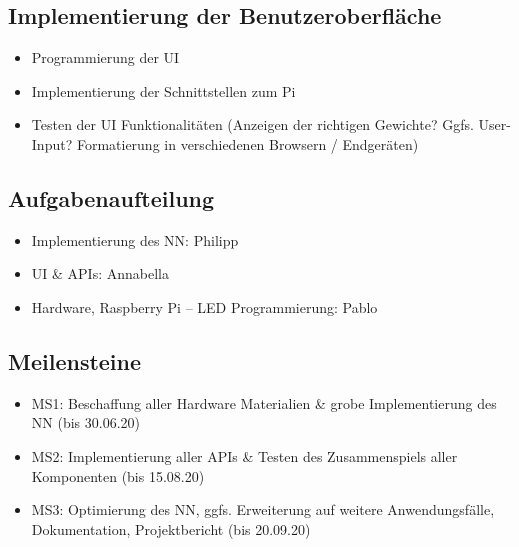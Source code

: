 \subsection{Implementierung der Benutzeroberfläche}
\label{sec:ImplementierungBenutzeroberflaeche}

\begin{itemize}
	\item Programmierung der UI
	\item Implementierung der Schnittstellen zum Pi 
	\item Testen der UI Funktionalit\"aten (Anzeigen der richtigen Gewichte? Ggfs. User-Input? Formatierung in verschiedenen Browsern / Endger\"aten)
\end{itemize}



\subsection{Aufgabenaufteilung}
\label{sec:aufgabenaufteilung}

\begin{itemize}
	\item Implementierung des NN: Philipp
	\item UI \& APIs: Annabella
	\item Hardware, Raspberry Pi -- LED Programmierung: Pablo
\end{itemize}


\subsection{Meilensteine}
\label{sec:meilensteine}

\begin{itemize}
	\item MS1: Beschaffung aller Hardware Materialien \& grobe Implementierung des NN (bis 30.06.20)
	\item MS2: Implementierung aller APIs \& Testen des Zusammenspiels aller Komponenten (bis 15.08.20)
	\item MS3: Optimierung des NN, ggfs. Erweiterung auf weitere Anwendungsf\"alle, Dokumentation, Projektbericht (bis 20.09.20)
\end{itemize}

